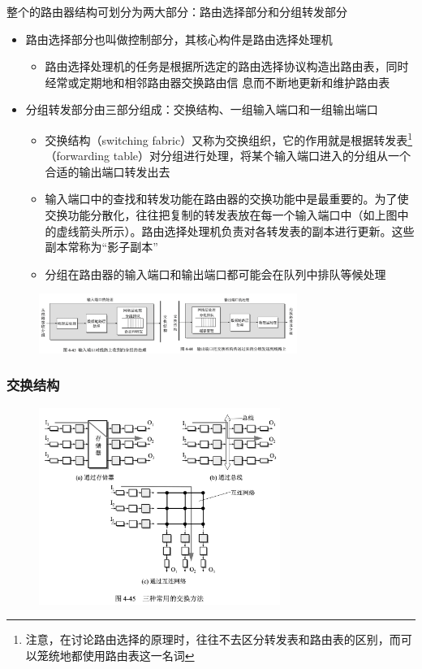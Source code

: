 \documentclass[cs4size,a4paper,10pt]{ctexart}
\begin{document}
	整个的路由器结构可划分为两大部分：路由选择部分和分组转发部分
	\begin{itemize}
		\item 路由选择部分也叫做控制部分，其核心构件是路由选择处理机
		\begin{itemize}
			\item 路由选择处理机的任务是根据所选定的路由选择协议构造出路由表，同时经常或定期地和相邻路由器交换路由信 息而不断地更新和维护路由表
		\end{itemize}
		\item 分组转发部分由三部分组成：交换结构、一组输入端口和一组输出端口
		\begin{itemize}
			\item 交换结构（switching fabric）又称为交换组织，它的作用就是根据转发表\footnote{注意，在讨论路由选择的原理时，往往不去区分转发表和路由表的区别，而可以笼统地都使用路由表这一名词}
			（forwarding table）对分组进行处理，将某个输入端口进入的分组从一个合适的输出端口转发出去
			\item 输入端口中的查找和转发功能在路由器的交换功能中是最重要的。为了使交换功能分散化，往往把复制的转发表放在每一个输入端口中（如上图中的虚线箭头所示）。路由选择处理机负责对各转发表的副本进行更新。这些副本常称为“影子副本”
			\item 分组在路由器的输入端口和输出端口都可能会在队列中排队等候处理
		\end{itemize}
	\end{itemize}

	\begin{figure}[H]
		\centering
		\includegraphics[width=0.75\textwidth]{img/4.43}
	\end{figure}

	\subsubsection{交换结构}
	\begin{figure}[H]
		\centering
		\includegraphics[width=0.7\textwidth]{img/4.45}
	\end{figure}
\end{document}
